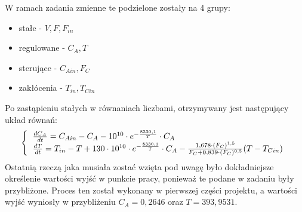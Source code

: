 W ramach zadania zmienne te podzielone zostały na 4 grupy:\\
\begin{itemize}
	\item stałe - $V,F,F_{in}$
	\item regulowane - $C_A,T$
	\item sterujące - $C_{Ain},F_C$
	\item zakłócenia - $T_{in},T_{Cin}$
\end{itemize}
Po zastąpieniu stałych w równaniach liczbami, otrzymywany jest następujący układ równań:\\
\begin{equation}
	\left\{
	\begin{tabular}{l}
	$\frac{dC_A}{dt} = C_{Ain} - C_A - 10^{10}\cdot e^{-\frac{8330,1}{T}}\cdot C_A$\\
	$\frac{dT}{dt} = T_{in} - T + 130\cdot 10^{10}\cdot e^{-\frac{8330,1}{T}}\cdot C_A-\frac{1,678\cdot (F_C)^{1,5}}{F_C+0,839\cdot (F_C)^{0,5}}(T-T_{Cin})$
	\end{tabular}
	\right.
\end{equation}
Ostatnią rzeczą jaka musiała zostać wzięta pod uwagę było dokładniejsze określenie wartości wyjść w punkcie pracy, ponieważ te podane w zadaniu były przybliżone. Proces ten został wykonany w pierwszej części projektu, a wartości wyjść wyniosły w przybliżeniu $C_A = 0,2646$ oraz $T = 393,9531$.
